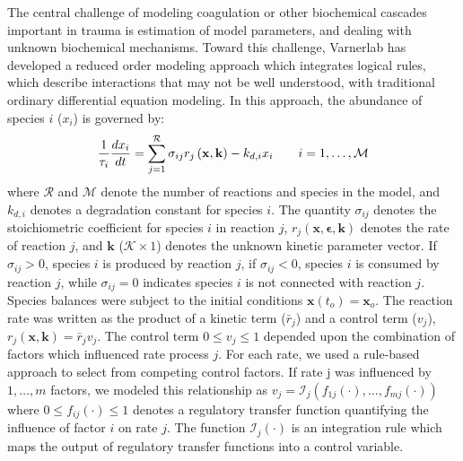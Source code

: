 \documentclass[11pt]{article}
\begin{document}
The central challenge of modeling coagulation or other biochemical cascades important in trauma is estimation of model parameters, and dealing with unknown biochemical mechanisms.
Toward this challenge, Varnerlab has developed a reduced order modeling approach which integrates logical rules, which describe interactions that may not be
well understood, with traditional ordinary differential equation modeling.
In this approach, the abundance of species $i$ ($x_{i}$) is governed by:
\begin{equation}
	\frac{1}{\tau_{i}}\frac{dx_{i}}{dt}  =  \sum_{j = 1}^{\mathcal{R}}\sigma_{ij}r_{j}\left(\mathbf{x},\mathbf{k}\right) - k_{d,i}x_{i}\qquad{i=1,\hdots,\mathcal{M}}\\
\end{equation}
where $\mathcal{R}$ and $\mathcal{M}$ denote the number of reactions and species in the model, and $k_{d,i}$ denotes a degradation constant for species $i$.
The quantity $\sigma_{ij}$ denotes the stoichiometric coefficient for species $i$ in reaction $j$,
$r_{j}\left(\mathbf{x},\mathbf{\epsilon},\mathbf{k}\right)$ denotes the rate of reaction $j$, and $\mathbf{k}$ ($\mathcal{K}\times{1}$) denotes the unknown kinetic parameter vector.
If $\sigma_{ij}>0$, species $i$ is produced by reaction $j$, if $\sigma_{ij}<0$, species $i$ is consumed by reaction $j$,
while $\sigma_{ij} = 0$ indicates species $i$ is not connected with reaction $j$.
Species balances were subject to the initial conditions $\mathbf{x}\left(t_{o}\right) = \mathbf{x}_{o}$.
The reaction rate was written as the product of a kinetic term ($\bar{r}_{j}$) and a control term ($v_{j}$), $r_{j}\left(\mathbf{x},\mathbf{k}\right) = \bar{r}_{j}v_{j}$.
The control term $0\leq v_{j}\leq 1$ depended upon the combination of factors which influenced rate process $j$.
For each rate, we used a rule-based approach to select from competing control factors.
If rate j was influenced by $1,\dots,m$ factors, we modeled this relationship as
$v_{j} = \mathcal{I}_{j}\left(f_{1j}\left(\cdot\right),\hdots,f_{mj}\left(\cdot\right)\right)$
where $0\leq f_{ij}\left(\cdot\right)\leq 1$ denotes a regulatory transfer function quantifying the influence of factor $i$ on rate $j$.
The function $\mathcal{I}_{j}\left(\cdot\right)$ is an integration rule which maps the output of regulatory transfer functions into a control
variable.
\end{document}
